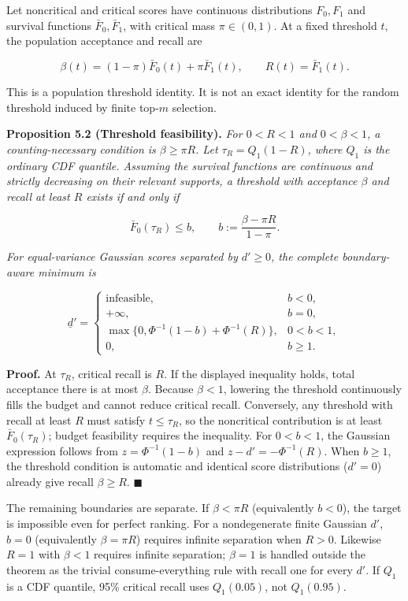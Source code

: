 \documentclass[
  11pt]{article}
\begin{document}
Let noncritical and critical scores have continuous distributions
\(F_0,F_1\) and survival functions \(\bar F_0,\bar F_1\), with critical
mass \(\pi\in(0,1)\). At a fixed threshold \(t\), the population
acceptance and recall are

\[\beta(t)=(1-\pi)\bar F_0(t)+\pi\bar F_1(t),\qquad R(t)=\bar F_1(t).\]

This is a population threshold identity. It is not an exact identity for
the random threshold induced by finite top-\(m\) selection.

\textbf{Proposition 5.2 (Threshold feasibility).} \emph{For \(0<R<1\)
and \(0<\beta<1\), a counting-necessary condition is \(\beta\ge\pi R\).
Let \(\tau_R=Q_1(1-R)\), where \(Q_1\) is the ordinary CDF quantile.
Assuming the survival functions are continuous and strictly decreasing
on their relevant supports, a threshold with acceptance \(\beta\) and
recall at least \(R\) exists if and only if}

\[\bar F_0(\tau_R)\le b,\qquad b:=\frac{\beta-\pi R}{1-\pi}.\]

\emph{For equal-variance Gaussian scores separated by \(d'\ge0\), the
complete boundary-aware minimum is}

\[\underline d'=\begin{cases}
\text{infeasible},&b<0,\\
+\infty,&b=0,\\
\max\{0,\Phi^{-1}(1-b)+\Phi^{-1}(R)\},&0<b<1,\\
0,&b\ge1.
\end{cases}\]

\textbf{Proof.} At \(\tau_R\), critical recall is \(R\). If the
displayed inequality holds, total acceptance there is at most \(\beta\).
Because \(\beta<1\), lowering the threshold continuously fills the
budget and cannot reduce critical recall. Conversely, any threshold with
recall at least \(R\) must satisfy \(t\le\tau_R\), so the noncritical
contribution is at least \(\bar F_0(\tau_R)\); budget feasibility
requires the inequality. For \(0<b<1\), the Gaussian expression follows
from \(z=\Phi^{-1}(1-b)\) and \(z-d'=-\Phi^{-1}(R)\). When \(b\ge1\),
the threshold condition is automatic and identical score distributions
(\(d'=0\)) already give recall \(\beta\ge R\). \(\blacksquare\)

The remaining boundaries are separate. If \(\beta<\pi R\) (equivalently
\(b<0\)), the target is impossible even for perfect ranking. For a
nondegenerate finite Gaussian \(d'\), \(b=0\) (equivalently
\(\beta=\pi R\)) requires infinite separation when \(R>0\). Likewise
\(R=1\) with \(\beta<1\) requires infinite separation; \(\beta=1\) is
handled outside the theorem as the trivial consume-everything rule with
recall one for every \(d'\). If \(Q_1\) is a CDF quantile, 95\% critical
recall uses \(Q_1(0.05)\), not \(Q_1(0.95)\).
\end{document}
